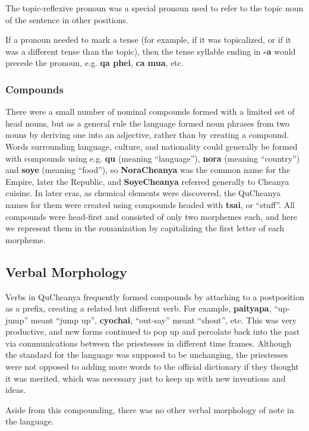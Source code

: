 \documentclass{article}
\begin{document}
The topic-reflexive pronoun was a special pronoun used to refer to the topic noun of the sentence in other positions.

If a pronoun needed to mark a tense (for example, if it was topicalized, or if it was a different tense than the topic), then the tense syllable ending in \textbf{-a} would precede the pronoun, e.g. \textbf{qa phei}, \textbf{ca mua}, etc.

\subsubsection{Compounds}

There were a small number of nominal compounds formed with a limited set of head nouns, but as a general rule the language formed noun phrases from two nouns by deriving one into an adjective, rather than by creating a compound.  Words surrounding language, culture, and nationality could generally be formed with compounds using e.g. \textbf{qu} (meaning ``language''), \textbf{nora} (meaning ``country'') and \textbf{soye} (meaning ``food''), so \textbf{NoraCheanya} was the common name for the Empire, later the Republic, and \textbf{SoyeCheanya} referred generally to Cheanya cuisine.  In later eras, as chemical elements were discovered, the QuCheanya names for them were created using compounds headed with \textbf{tsai}, or ``stuff''.  All compounds were head-first and consisted of only two morphemes each, and here we represent them in the romanization by capitalizing the first letter of each morpheme.

\subsection{Verbal Morphology}

Verbs in QuCheanya frequently formed compounds by attaching to a postposition as a prefix, creating a related but different verb.  For example, \textbf{paityapa}, ``up-jump'' meant ``jump up'', \textbf{cyochai}, ``out-say'' meant ``shout'', etc.  This was very productive, and new forms continued to pop up and percolate back into the past via communications between the priestesses in different time frames.  Although the standard for the language was supposed to be unchanging, the priestesses were not opposed to adding more words to the official dictionary if they thought it was merited, which was necessary just to keep up with new inventions and ideas.

Aside from this compounding, there was no other verbal morphology of note in the language.
\end{document}
